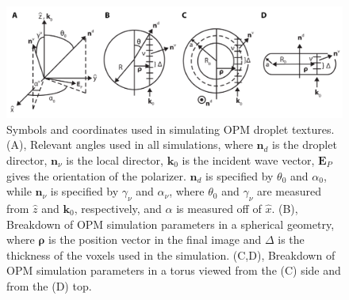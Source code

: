 \begin{figure}
\centering
\includegraphics{figures/C4/Ch4-Figs_JonesGeometry.png}
\caption{Symbols and coordinates used in simulating OPM droplet textures.
(A), Relevant angles used in all simulations, where $\mathbf{n}_d$ is the droplet director, $\mathbf{n}_{\nu}$ is the local director, $\mathbf{k}_0$ is the incident wave vector, $\mathbf{E}_P$ gives the orientation of the polarizer.
$\mathbf{n}_d$ is specified by $\theta_0$ and $\alpha_0$, while $\mathbf{n}_{\nu}$ is specified by $\gamma_{\nu}$ and $\alpha_{\nu}$, where $\theta_0$ and $\gamma_{\nu}$ are measured from $\hat{z}$ and $\mathbf{k}_0$, respectively, and $\alpha$ is measured off of $\hat{x}$.
(B), Breakdown of OPM simulation parameters in a spherical geometry, where $\bm{\rho}$ is the position vector in the final image and $\Delta$ is the thickness of the voxels used in the simulation.
(C,D), Breakdown of OPM simulation parameters in a torus viewed from the (C) side and from the (D) top.}\label{f:4-generalcoords}
\end{figure}

